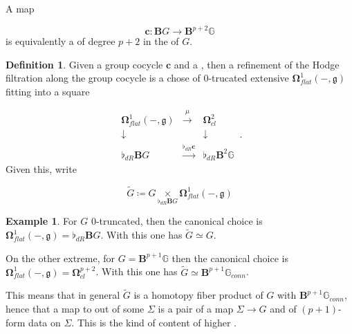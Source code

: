 \documentclass[12pt,titlepage]{article}
\newcommand{\itexarray}[1]{\begin{matrix}#1\end{matrix}}
\theoremstyle{plain}
\theoremstyle{definition}
\newtheorem{defn}{Definition}
\newtheorem{example}{Example}
\theoremstyle{remark}
\begin{document}
A map

\begin{displaymath}
\mathbf{c} \colon \mathbf{B}G \longrightarrow \mathbf{B}^{p+2} \mathbb{G}
\end{displaymath}
is equivalently a  of degree $p+2$ in the  of $G$.

\begin{defn}
\label{FormRefinementOfCocycle}\hypertarget{FormRefinementOfCocycle}{}
Given a group cocycle $\mathbf{c}$ and a , then a refinement of the Hodge filtration along the group cocycle is a chose of 0-trucated extensive $\mathbf{\Omega}^1_{flat}(-,\mathfrak{g})$ fitting into a square

\begin{displaymath}
\itexarray{
    \mathbf{\Omega}^1_{flat}(-,\mathfrak{g})
    &\stackrel{\mu}{\longrightarrow}&
    \mathbf{\Omega}^2_{cl}
    \\
    \downarrow && \downarrow
    \\
    \flat_{dR} \mathbf{B}G
    &\stackrel{\flat_{dR}\mathbf{c}}{\longrightarrow}&
    \flat_{dR} \mathbf{B}^2 \mathbb{G}
  }
  \,.
\end{displaymath}
Given this, write

\begin{displaymath}
\tilde G
  \coloneqq G \underset{\flat_{dR}\mathbf{B}G}{\times} \mathbf{\Omega}^1_{flat}(-,\mathfrak{g})
\end{displaymath}
\end{defn}
\begin{example}
\label{}\hypertarget{}{}
For $G$ 0-truncated, then the canonical choice is $\mathbf{\Omega}^1_{flat}(-,\mathfrak{g}) = \flat_{dR}\mathbf{B}G$. With this one has $\tilde G \simeq G$.

On the other extreme, for $G = \mathbf{B}^{p+1}\mathbb{G}$ then the canonical choice is $\mathbf{\Omega}^1_{flat}(-,\mathfrak{g}) = \mathbf{\Omega}^{p+2}_{cl}$. With this one has $\tilde G \simeq \mathbf{B}^{p+1}\mathbb{G}_{conn}$.

This means that in general $\tilde G$ is a homotopy fiber product of $G$ with $\mathbf{B}^{p+1}\mathbb{G}_{conn}$, hence that a map to out of some $\Sigma$ is a pair of a map $\Sigma \to G$ and of $(p+1)$-form data on $\Sigma$. This is the kind of  content of higher .

\end{example}
\end{document}
